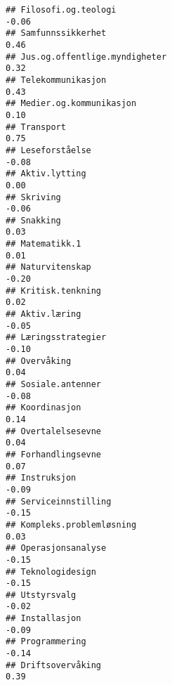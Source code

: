 \documentclass[
]{article}
\begin{document}
\begin{verbatim}
## Filosofi.og.teologi                                                              -0.06
## Samfunnssikkerhet                                                                 0.46
## Jus.og.offentlige.myndigheter                                                     0.32
## Telekommunikasjon                                                                 0.43
## Medier.og.kommunikasjon                                                           0.10
## Transport                                                                         0.75
## Leseforståelse                                                                   -0.08
## Aktiv.lytting                                                                     0.00
## Skriving                                                                         -0.06
## Snakking                                                                          0.03
## Matematikk.1                                                                      0.01
## Naturvitenskap                                                                   -0.20
## Kritisk.tenkning                                                                  0.02
## Aktiv.læring                                                                     -0.05
## Læringsstrategier                                                                -0.10
## Overvåking                                                                        0.04
## Sosiale.antenner                                                                 -0.08
## Koordinasjon                                                                      0.14
## Overtalelsesevne                                                                  0.04
## Forhandlingsevne                                                                  0.07
## Instruksjon                                                                      -0.09
## Serviceinnstilling                                                               -0.15
## Kompleks.problemløsning                                                           0.03
## Operasjonsanalyse                                                                -0.15
## Teknologidesign                                                                  -0.15
## Utstyrsvalg                                                                      -0.02
## Installasjon                                                                     -0.09
## Programmering                                                                    -0.14
## Driftsovervåking                                                                  0.39

\end{verbatim}
\end{document}
